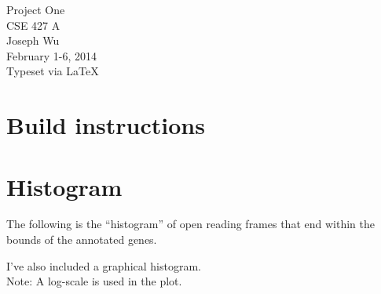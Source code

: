 \documentclass[a4paper, 12pt]{report}
\begin{document}
    \begin{center}
        {\LARGE Project One} \\
        CSE 427 A \\
        Joseph Wu  \\
        February 1-6, 2014 \\
        {\tiny Typeset via \LaTeX}
    \end{center}
    
\section{Build instructions}
    
\section{Histogram}
    The following is the ``histogram'' of open reading frames 
    that end within the bounds of the annotated genes.  
    
    
    I've also included a graphical histogram. \\
    Note: A log-scale is used in the plot.
    
\end{document}
